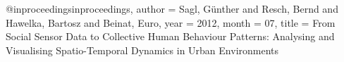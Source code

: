 @inproceedings{inproceedings,
author = {Sagl, Günther and Resch, Bernd and Hawelka, Bartosz and Beinat, Euro},
year = {2012},
month = {07},
title = {From Social Sensor Data to Collective Human Behaviour Patterns: Analysing and Visualising Spatio-Temporal Dynamics in Urban Environments}
}